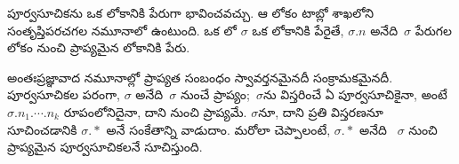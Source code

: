 \documentclass[../../../include/open-logic-section]{subfiles}
\begin{document}
పూర్వసూచికను ఒక లోకానికి పేరుగా భావించవచ్చు.
ఆ లోకం టాబ్లో శాఖలోని 
సంతృప్తిపరచగల నమూనాలో ఉంటుంది. ఒక
లో
$\sigma$ ఒక లోకానికి పేరైతే,
$\sigma.n$ అనేది~$\sigma$ పేరుగల లోకం నుంచి
ప్రాప్యమైన లోకానికి పేరు.

అంతఃప్రజ్ఞావాద నమూనాల్లో ప్రాప్యత
సంబంధం స్వావర్తనమైనదీ సంక్రామకమైనదీ.
పూర్వసూచికల పరంగా, $\sigma$
అనేది~$\sigma$ నుంచే ప్రాప్యం;~$\sigma$ను
విస్తరించే ఏ పూర్వసూచికైనా, అంటే
$\sigma.n_1.\cdots.n_k$ రూపంలోనిదైనా,
దాని నుంచి ప్రాప్యమే. $\sigma$నూ,
దాని ప్రతి విస్తరణనూ సూచించడానికి
$\sigma.*$ అనే సంకేతాన్ని వాడుదాం.
మరోలా చెప్పాలంటే, $\sigma.*$ అనేది
~$\sigma$ నుంచి ప్రాప్యమైన పూర్వసూచికలనే సూచిస్తుంది.
\end{document}
